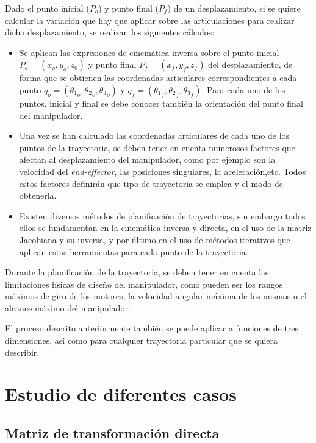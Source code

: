 \documentclass[a4paper,12pt]{article}
\begin{document}
Dado el punto inicial ($P_o$) y punto final ($P_f$) de un desplazamiento, si se quiere calcular la variación que hay que aplicar
sobre las articulaciones para realizar dicho desplazamiento, se realizan los siguientes cálculos:
\begin{itemize}
    \item Se aplican las expresiones de cinemática inversa sobre el punto inicial $P_{o} = \left(x_{o}, y_{o}, z_{0}\right)$
          y punto final $P_{f} = \left(x_{f}, y_{f}, z_{f}\right)$ del desplazamiento, de forma que se obtienen las coordenadas
          articulares correspondientes a cada punto $q_{o} = \left({\theta_{1}}_o, {\theta_{2}}_o,{\theta_{3}}_o\right)$ y
          $q_{f} = \left({\theta_{1}}_f, {\theta_{2}}_f,{\theta_{3}}_f\right)$. Para cada uno de los puntos, inicial y 
          final se debe conocer también la  orientación del punto final del manipulador.
    \item Una vez se han calculado las coordenadas articulares de cada uno de los puntos de la trayectoria, se deben 
    tener en cuenta numerosos factores que afectan al desplazamiento del manipulador, como por ejemplo son la velocidad
    del \textit{end-effector}, las posiciones singulares, la aceleración,etc. Todos estos factores definirán que tipo de 
    trayectoria se emplea y el modo de obtenerla.

    \item Existen diversos métodos de planificación de trayectorias, sin embargo todos ellos se fundamentan en la 
    cinemática inversa y directa, en el uso de la matriz Jacobiana y su inversa, y por último en el uso de 
    métodos iterativos que aplican estas herramientas para cada punto de la trayectoria.
    \end{itemize}

Durante la planificación de la trayectoria, se deben tener en cuenta las limitaciones físicas de diseño del manipulador, 
como pueden ser los rangos máximos de giro de los motores, la velocidad angular máxima de los mismos o el alcance máximo del manipulador.

El proceso descrito anteriormente también se puede aplicar a funciones de tres dimensiones, así como para cualquier trayectoria particular que se quiera describir.

\section{Estudio de diferentes casos}
\subsection{Matriz de transformación directa}
\end{document}
